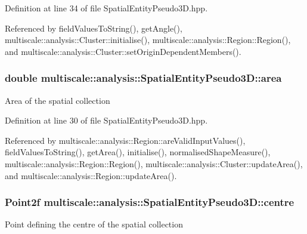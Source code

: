 Definition at line 34 of file Spatial\-Entity\-Pseudo3\-D.\-hpp.



Referenced by field\-Values\-To\-String(), get\-Angle(), multiscale\-::analysis\-::\-Cluster\-::initialise(), multiscale\-::analysis\-::\-Region\-::\-Region(), and multiscale\-::analysis\-::\-Cluster\-::set\-Origin\-Dependent\-Members().

\hypertarget{classmultiscale_1_1analysis_1_1SpatialEntityPseudo3D_a1621d5b3ece663bf4c5501940e860292}{
\subsubsection[{area}]{\setlength{\rightskip}{0pt plus 5cm}double multiscale\-::analysis\-::\-Spatial\-Entity\-Pseudo3\-D\-::area\hspace{0.3cm}{\ttfamily [protected]}}}\label{classmultiscale_1_1analysis_1_1SpatialEntityPseudo3D_a1621d5b3ece663bf4c5501940e860292}
Area of the spatial collection 

Definition at line 30 of file Spatial\-Entity\-Pseudo3\-D.\-hpp.



Referenced by multiscale\-::analysis\-::\-Region\-::are\-Valid\-Input\-Values(), field\-Values\-To\-String(), get\-Area(), initialise(), normalised\-Shape\-Measure(), multiscale\-::analysis\-::\-Region\-::\-Region(), multiscale\-::analysis\-::\-Cluster\-::update\-Area(), and multiscale\-::analysis\-::\-Region\-::update\-Area().

\hypertarget{classmultiscale_1_1analysis_1_1SpatialEntityPseudo3D_a647c25f9544d5537938bbadefc436634}{
\subsubsection[{centre}]{\setlength{\rightskip}{0pt plus 5cm}Point2f multiscale\-::analysis\-::\-Spatial\-Entity\-Pseudo3\-D\-::centre\hspace{0.3cm}{\ttfamily [protected]}}}\label{classmultiscale_1_1analysis_1_1SpatialEntityPseudo3D_a647c25f9544d5537938bbadefc436634}
Point defining the centre of the spatial collection 

